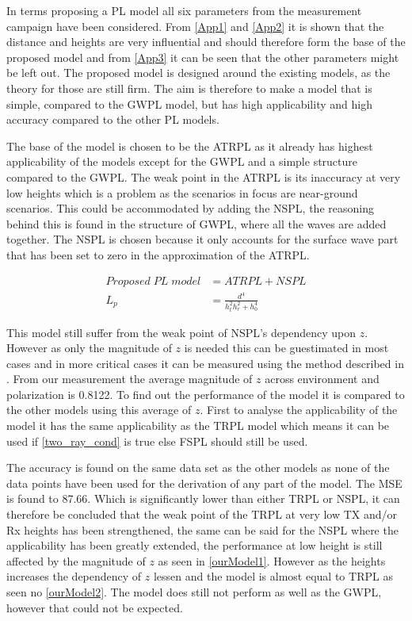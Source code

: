 

In terms proposing a PL model all six parameters from the measurement campaign have been considered. From \autoref{App1} and \autoref{App2} it is shown that the distance and heights are very influential and should therefore form the base of the proposed model and from \autoref{App3} it can be seen that the other parameters might be left out. %
The proposed model is designed around the existing models, as the theory for those are still firm. The aim is therefore to make a model that is simple, compared to the GWPL model, but has high applicability and high accuracy compared to the other PL models. 


The base of the model is chosen to be the ATRPL as it already has highest applicability of the models except for the GWPL and a simple structure compared to the GWPL. The weak point in the ATRPL is its inaccuracy at very low heights which is a problem as the scenarios in focus are near-ground scenarios. This could be accommodated by adding the NSPL, the reasoning behind this is found in the structure of GWPL, where all the waves are added together. The NSPL is chosen because it only accounts for the surface wave part that has been set to zero in the approximation of the ATRPL. 

\begin{align}
Proposed\; PL\; model &= ATRPL + NSPL \\
L_p &= \frac{d^4}{h_t^2 h_r^2+h_0^4}
\end{align}

This model still suffer from the weak point of NSPL's dependency upon $z$. However as only the magnitude of $z$ is needed this can be guestimated in most cases and in more critical cases it can be measured using the method described in \cite{Kim}. From our measurement the average magnitude of $z$ across environment and polarization is 0.8122. To find out the performance of the model it is compared to the other models using this average of $z$. First to analyse the applicability of the model it has the same applicability as the TRPL model which means it can be used if \eqref{two_ray_cond} is true else FSPL should still be used. 




The accuracy is found on the same data set as the other models as none of the data points have been used for the derivation of any part of the model. The MSE is found to 87.66. Which is significantly lower than either TRPL or NSPL, it can therefore be concluded that the weak point of the TRPL at very low TX and/or Rx heights has been strengthened, the same can be said for the NSPL where the applicability has been greatly extended, the performance at low height is still affected by the magnitude of $z$ as seen in \autoref{ourModel1}. However as the heights increases the dependency of $z$ lessen and the model is almost equal to TRPL as seen no \autoref{ourModel2}. The model does still not perform as well as the GWPL, however that could not be expected.

